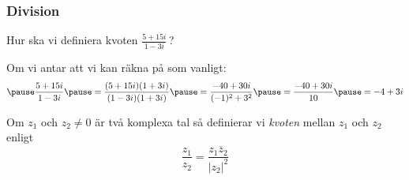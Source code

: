 \documentclass[slidestop,blue,handout,9pt]{beamer}
\begin{document}
\begin{frame}
\frametitle{Division}



\begin{exempel}
Hur ska vi definiera kvoten $\displaystyle\frac{5 + 15i}{1 - 3i}$\,?

\begin{losning}
\noindent Om vi antar att vi kan räkna på som vanligt:
\begin{equation*}
\pause
\frac{5 + 15i}{1 - 3i} 
\pause = \frac{(5 +15i)(1 + 3i)}{(1 - 3i)(1 + 3i)}
\pause = \frac{-40 + 30i}{(-1)^2 + 3^2} 
\pause = \frac{-40 + 30i}{10} 
\pause = -4 + 3i
\end{equation*}
\end{losning}
\end{exempel} 

\begin{definition}[Division]
Om $z_1$ och $z_2 \neq 0$ är två komplexa tal så definierar vi \emph{kvoten} mellan 
$z_1$ och $z_2$ enligt 
\begin{equation*}
\frac{z_1}{z_2} = \frac{z_1\overline{z}_2}{|z_2|^2}
\end{equation*}
\end{definition}
\end{frame}



\end{document}
